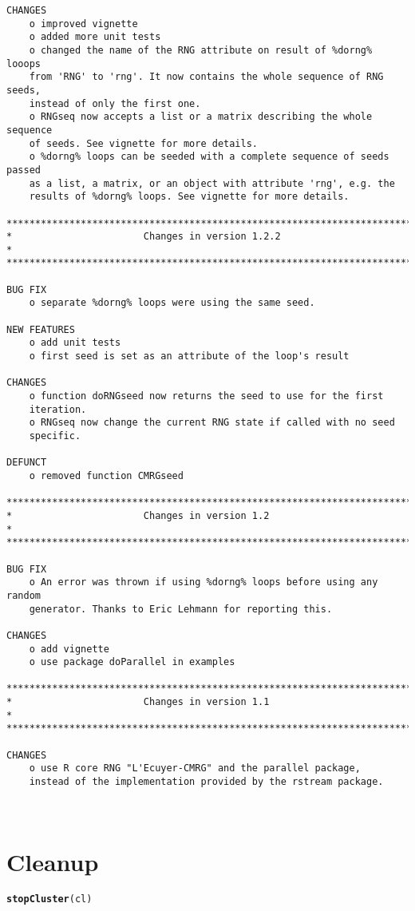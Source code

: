 \documentclass[a4paper,12pt]{article}\usepackage{graphicx, color}
\makeatletter
\newcommand{\hlfunctioncall}[1]{\textcolor[rgb]{0.501960784313725,0,0.329411764705882}{\textbf{#1}}}%
\newenvironment{kframe}{%
 \def\at@end@of@kframe{}%
 \ifinner\ifhmode%
  \def\at@end@of@kframe{\end{minipage}}%
  \begin{minipage}{\columnwidth}%
 \fi\fi%
 \def\FrameCommand##1{\hskip\@totalleftmargin \hskip-\fboxsep
 \colorbox{shadecolor}{##1}\hskip-\fboxsep
     \hskip-\linewidth \hskip-\@totalleftmargin \hskip\columnwidth}%
 \MakeFramed {\advance\hsize-\width
   \@totalleftmargin\z@ \linewidth\hsize
   \@setminipage}}%
 {\par\unskip\endMakeFramed%
 \at@end@of@kframe}
\newenvironment{knitrout}{}{} %
\renewenvironment{knitrout}{\begin{footnotesize}}{\end{footnotesize}}
\makeatother
\begin{document}
{\begin{verbatim}
CHANGES
    o improved vignette
    o added more unit tests
    o changed the name of the RNG attribute on result of %dorng% looops 
    from 'RNG' to 'rng'. It now contains the whole sequence of RNG seeds, 
    instead of only the first one.
    o RNGseq now accepts a list or a matrix describing the whole sequence 
    of seeds. See vignette for more details.
    o %dorng% loops can be seeded with a complete sequence of seeds passed 
    as a list, a matrix, or an object with attribute 'rng', e.g. the 
    results of %dorng% loops. See vignette for more details.
    
*************************************************************************
*                       Changes in version 1.2.2                        *
*************************************************************************

BUG FIX
    o separate %dorng% loops were using the same seed.

NEW FEATURES
    o add unit tests
    o first seed is set as an attribute of the loop's result

CHANGES
    o function doRNGseed now returns the seed to use for the first 
    iteration.
    o RNGseq now change the current RNG state if called with no seed 
    specific.  
    
DEFUNCT
    o removed function CMRGseed

*************************************************************************
*                       Changes in version 1.2                          *
*************************************************************************

BUG FIX
    o An error was thrown if using %dorng% loops before using any random
    generator. Thanks to Eric Lehmann for reporting this.

CHANGES
    o add vignette
    o use package doParallel in examples

*************************************************************************
*                       Changes in version 1.1                          *
*************************************************************************

CHANGES
    o use R core RNG "L'Ecuyer-CMRG" and the parallel package, 
    instead of the implementation provided by the rstream package.



\end{verbatim}
}


\section*{Cleanup}
\begin{knitrout}
\color{fgcolor}\begin{kframe}
\begin{alltt}
\hlfunctioncall{stopCluster}(cl)
\end{alltt}
\end{kframe}
\end{knitrout}
\end{document}
